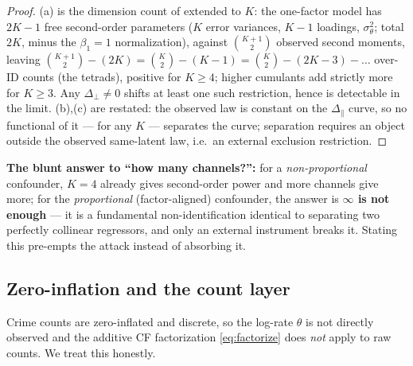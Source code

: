 \documentclass[11pt]{article}
\theoremstyle{definition}
\newcommand{\Th}{\theta}
\newcommand{\lat}{\Th}
\newcommand{\Dperp}{\Delta_{\perp}}
\newcommand{\Dpar}{\Delta_{\parallel}}
\begin{document}
\begin{proof}
(a) is the dimension count of  extended to $K$: the one-factor
model has $2K-1$ free second-order parameters ($K$ error variances, $K-1$
loadings, $\sigma_\lat^2$; total $2K$, minus the $\beta_1=1$ normalization),
against $\binom{K+1}{2}$ observed second moments, leaving
$\binom{K+1}{2}-(2K)=\binom K2-(K-1)=\binom K2-(2K-3)-\dots$ over-ID counts
(the tetrads), positive for $K\ge4$; higher cumulants add strictly more for
$K\ge3$. Any $\Dperp\neq0$ shifts at least one such restriction, hence is
detectable in the limit. (b),(c) are  restated: the
observed law is constant on the $\Dpar$ curve, so no functional of it --- for
any $K$ --- separates the curve; separation requires an object outside the
observed same-latent law, i.e.\ an external exclusion restriction.
\end{proof}

\noindent\textbf{The blunt answer to ``how many channels?'':} for a
\emph{non-proportional} confounder, $K=4$ already gives second-order power and
more channels give more; for the \emph{proportional} (factor-aligned)
confounder, the answer is \textbf{$\infty$ is not enough} --- it is a
fundamental non-identification identical to separating two perfectly collinear
regressors, and only an external instrument breaks it. Stating this pre-empts
the attack instead of absorbing it.

\subsection{Zero-inflation and the count layer}\label{sec:zip}

Crime counts are zero-inflated and discrete, so the log-rate $\lat$ is not
directly observed and the additive CF factorization \eqref{eq:factorize} does
\emph{not} apply to raw counts. We treat this honestly.
\end{document}
